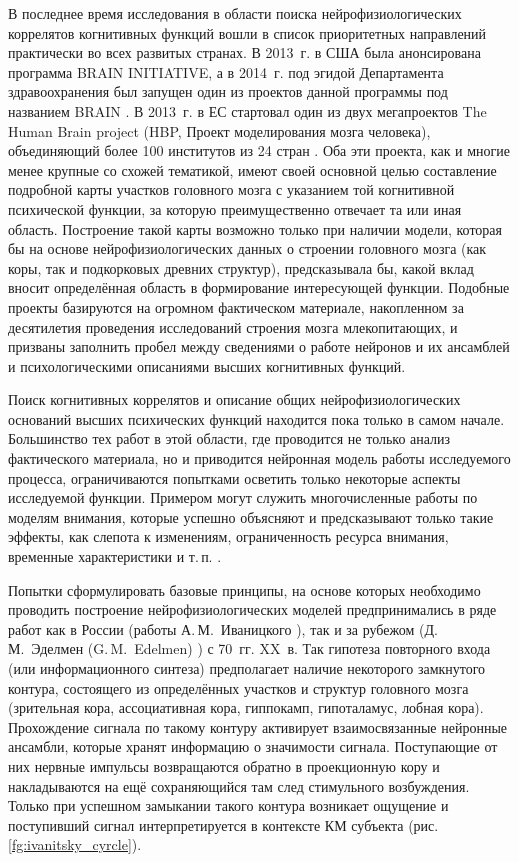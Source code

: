 В последнее время исследования в области поиска нейрофизиологических коррелятов когнитивных функций вошли в список приоритетных направлений практически во всех развитых странах. В 2013~г. в США была анонсирована программа BRAIN INITIATIVE, а в 2014~г. под эгидой Департамента здравоохранения был запущен один из проектов данной программы под названием BRAIN \cite{NIH2014}. В 2013~г. в ЕС стартовал один из двух мегапроектов The Human Brain project (HBP, Проект моделирования мозга человека), объединяющий более 100 институтов из 24 стран \cite{HBP2014}. Оба эти проекта, как и многие менее крупные со схожей тематикой, имеют своей основной целью составление подробной карты участков головного мозга с указанием той когнитивной психической функции, за которую преимущественно отвечает та или иная область. Построение такой карты возможно только при наличии модели, которая бы на основе нейрофизиологических данных о строении головного мозга (как коры, так и подкорковых древних структур), предсказывала бы, какой вклад вносит определённая область в формирование интересующей функции. Подобные проекты базируются на огромном фактическом материале, накопленном за десятилетия проведения исследований строения мозга млекопитающих, и призваны заполнить пробел между сведениями о работе нейронов и их ансамблей и психологическими описаниями высших когнитивных функций. 

Поиск когнитивных коррелятов и описание общих нейрофизиологических оснований высших психических функций находится пока только в самом начале. Большинство тех работ в этой области, где проводится не только анализ фактического материала, но и приводится нейронная модель работы исследуемого процесса, ограничиваются попытками осветить только некоторые аспекты исследуемой функции. Примером могут служить многочисленные работы по моделям внимания, которые успешно объясняют и предсказывают только такие эффекты, как слепота к изменениям, ограниченность ресурса внимания, временные характеристики и т.\,п. \cite{Borji2013}.

Попытки сформулировать базовые принципы, на основе которых необходимо проводить построение нейрофизиологических моделей предпринимались в ряде работ как в России (работы А.\,М.~Иваницкого \cite{Ivanitsky1996,IvanitskyE1996}), так и за рубежом (Д.\,М.~Эделмен (G.\,M.~Edelmen) \cite{Edelmen1981}) с 70~гг. XX~в. Так гипотеза повторного входа (или информационного синтеза) предполагает наличие некоторого замкнутого контура, состоящего из определённых участков и структур головного мозга (зрительная кора, ассоциативная кора, гиппокамп, гипоталамус, лобная кора). Прохождение сигнала по такому контуру активирует взаимосвязанные нейронные ансамбли, которые хранят информацию о значимости сигнала. Поступающие от них нервные импульсы возвращаются обратно в проекционную кору и накладываются на ещё сохраняющийся там след стимульного возбуждения. Только при успешном замыкании такого контура возникает ощущение и поступивший сигнал интерпретируется в контексте КМ субъекта (рис. \ref{fg:ivanitsky_cyrcle}). 

